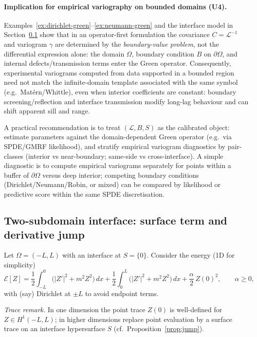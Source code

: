 \documentclass[11pt]{article}
\theoremstyle{definition}
\theoremstyle{plain}
\theoremstyle{remark}
\begin{document}
\paragraph{Implication for empirical variography on bounded domains (U4).}
Examples~\ref{ex:dirichlet-green}--\ref{ex:neumann-green} and the interface model in Section~\ref{sec:worked-interface}
show that in an operator-first formulation the covariance $C=\mathcal{L}^{-1}$ and variogram $\gamma$ are determined by the
\emph{boundary-value problem}, not the differential expression alone: the domain $\Omega$, boundary condition $B$ on $\partial\Omega$,
and internal defects/transmission terms enter the Green operator. Consequently, experimental variograms computed from data supported
in a bounded region need not match the infinite-domain template associated with the same symbol (e.g.\ Mat\'ern/Whittle), even when
interior coefficients are constant: boundary screening/reflection and interface transmission modify long-lag behaviour and can shift
apparent sill and range.

A practical recommendation is to treat $(\mathcal{L},B,S)$ as the calibrated object: estimate parameters against the domain-dependent
Green operator (e.g.\ via SPDE/GMRF likelihood), and stratify empirical variogram diagnostics by pair-classes (interior vs near-boundary;
same-side vs cross-interface). A simple diagnostic is to compute empirical variograms separately for points within a buffer of $\partial\Omega$
versus deep interior; competing boundary conditions (Dirichlet/Neumann/Robin, or mixed) can be compared by likelihood or predictive score
within the same SPDE discretisation.

\subsection{Two-subdomain interface: surface term and derivative jump}\label{sec:worked-interface}

Let $\Omega=(-L,L)$ with an interface at $S=\{0\}$.
Consider the energy (1D for simplicity)
\[
\mathcal{E}[Z]
=\frac12\int_{-L}^0 \big(|Z'|^2+m^2 Z^2\big)\,dx
+\frac12\int_0^{L} \big(|Z'|^2+m^2 Z^2\big)\,dx
+\frac{\alpha}{2}\,Z(0)^2,
\qquad \alpha\ge 0,
\]
with (say) Dirichlet at $\pm L$ to avoid endpoint terms.

\noindent\emph{Trace remark.} In one dimension the point trace $Z(0)$ is well-defined for $Z\in H^1(-L,L)$; in higher dimensions replace point evaluation by a surface trace on an interface hypersurface $S$ (cf.\ Proposition~\ref{prop:jump}).
\end{document}
